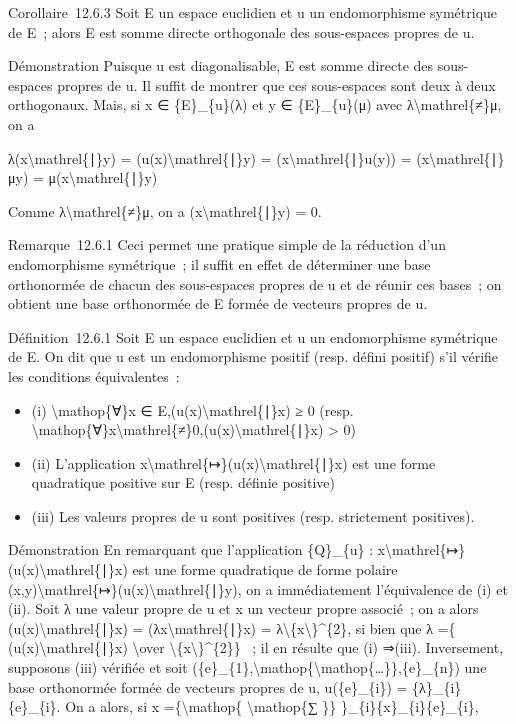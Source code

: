 \documentclass[]{article}
\begin{document}
Corollaire~12.6.3 Soit E un espace euclidien et u un endomorphisme
symétrique de E~; alors E est somme directe orthogonale des sous-espaces
propres de u.

Démonstration Puisque u est diagonalisable, E est somme directe des
sous-espaces propres de u. Il suffit de montrer que ces sous-espaces
sont deux à deux orthogonaux. Mais, si x ∈ \{E\}\_\{u\}(λ) et y ∈
\{E\}\_\{u\}(μ) avec λ\textbackslash{}mathrel\{≠\}μ, on a

λ(x\textbackslash{}mathrel\{∣\}y) = (u(x)\textbackslash{}mathrel\{∣\}y)
= (x\textbackslash{}mathrel\{∣\}u(y)) =
(x\textbackslash{}mathrel\{∣\}μy) = μ(x\textbackslash{}mathrel\{∣\}y)

Comme λ\textbackslash{}mathrel\{≠\}μ, on a
(x\textbackslash{}mathrel\{∣\}y) = 0.

Remarque~12.6.1 Ceci permet une pratique simple de la réduction d'un
endomorphisme symétrique~; il suffit en effet de déterminer une base
orthonormée de chacun des sous-espaces propres de u et de réunir ces
bases~; on obtient une base orthonormée de E formée de vecteurs propres
de u.

Définition~12.6.1 Soit E un espace euclidien et u un endomorphisme
symétrique de E. On dit que u est un endomorphisme positif (resp. défini
positif) s'il vérifie les conditions équivalentes~:

\begin{itemize}
\itemsep1pt\parskip0pt
\item
  (i) \textbackslash{}mathop\{∀\}x ∈
  E,(u(x)\textbackslash{}mathrel\{∣\}x) ≥ 0 (resp.
  \textbackslash{}mathop\{∀\}x\textbackslash{}mathrel\{≠\}0,(u(x)\textbackslash{}mathrel\{∣\}x)
  \textgreater{} 0)
\item
  (ii) L'application
  x\textbackslash{}mathrel\{↦\}(u(x)\textbackslash{}mathrel\{∣\}x) est
  une forme quadratique positive sur E (resp. définie positive)
\item
  (iii) Les valeurs propres de u sont positives (resp. strictement
  positives).
\end{itemize}

Démonstration En remarquant que l'application \{Q\}\_\{u\} :
x\textbackslash{}mathrel\{↦\}(u(x)\textbackslash{}mathrel\{∣\}x) est une
forme quadratique de forme polaire
(x,y)\textbackslash{}mathrel\{↦\}(u(x)\textbackslash{}mathrel\{∣\}y), on
a immédiatement l'équivalence de (i) et (ii). Soit λ une valeur propre
de u et x un vecteur propre associé~; on a alors
(u(x)\textbackslash{}mathrel\{∣\}x) = (λx\textbackslash{}mathrel\{∣\}x)
= λ\textbackslash{}\textbar{}\{x\textbackslash{}\textbar{}\}\^{}\{2\},
si bien que λ =\{ (u(x)\textbackslash{}mathrel\{∣\}x)
\textbackslash{}over
\textbackslash{}\textbar{}\{x\textbackslash{}\textbar{}\}\^{}\{2\}\} ~;
il en résulte que (i) ⇒(iii). Inversement, supposons (iii) vérifiée et
soit
(\{e\}\_\{1\},\textbackslash{}mathop\{\textbackslash{}mathop\{\ldots{}\}\},\{e\}\_\{n\})
une base orthonormée formée de vecteurs propres de u, u(\{e\}\_\{i\}) =
\{λ\}\_\{i\}\{e\}\_\{i\}. On a alors, si x =\{\textbackslash{}mathop\{
\textbackslash{}mathop\{∑ \}\} \}\_\{i\}\{x\}\_\{i\}\{e\}\_\{i\},
\end{document}
